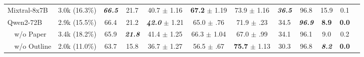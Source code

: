 \begin{table}[t]
{\begin{tabular}{lccccccccccc}
        Mixtral-8x7B
                              & 3.0k (16.3\%)
                              & \textbf{\itshape 66.5}
                              & 21.7
                              & 40.7 $\pm$ 1.16
                              & \textbf{67.2 }$\pm$ 1.19
                              & 73.9 $\pm$ 1.16
                              & \textbf{\itshape 36.5}
                              & 96.8
                              & 15.9
                              & 0.1
        \\
        Qwen2-72B
                              & 2.9k (15.5\%)
                              & 66.4
                              & 21.2
                              & \textbf{\itshape 42.0 }$\pm$ 1.21
                              & 65.0 $\pm$ .76
                              & 71.9 $\pm$ .23
                              & 34.5
                              & \textbf{\itshape 96.9}
                              & \textbf{8.9}
                              & \textbf{0.0}
        \\
        $\quad$w/o Paper
                              & 3.4k (18.2\%)
                              & 65.9
                              & \textbf{\itshape 21.8}
                              & 41.4 $\pm$ 1.25
                              & 66.3 $\pm$ 1.04
                              & 67.0 $\pm$ .99
                              & 34.1
                              & 96.1
                              & 9.0
                              & 0.2
        \\
        $\quad$w/o Outline
                              & 2.0k (11.0\%)
                              & 63.7
                              & 15.8
                              & 36.7 $\pm$ 1.27
                              & 56.5 $\pm$ .67
                              & \textbf{75.7 }$\pm$ 1.13
                              & 30.3
                              & 96.8
                              & \textbf{\itshape 8.2}
                              & \textbf{0.0}
        \\
    

\end{tabular}}
\end{table}

